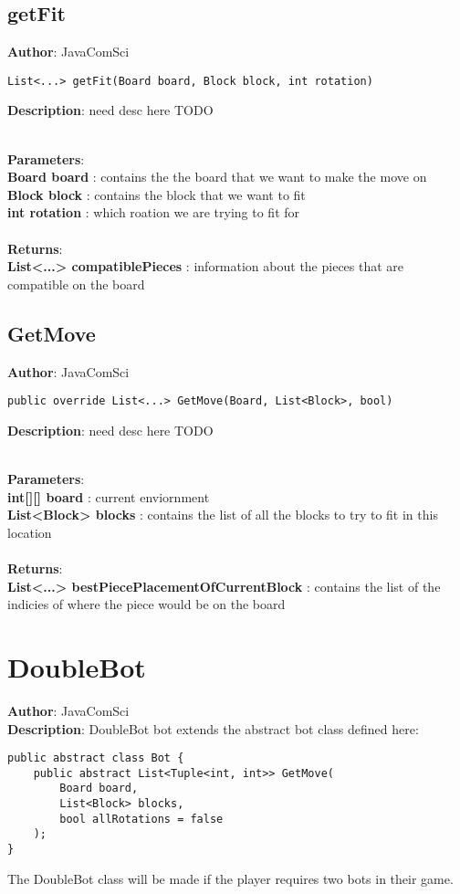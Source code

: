 \documentclass[12pt]{article}
\begin{document}
\subsection{getFit}
\textbf{Author}: JavaComSci 
\vspace*{1\baselineskip}
\begin{lstlisting}
List<...> getFit(Board board, Block block, int rotation)
\end{lstlisting} 
\vspace*{1\baselineskip}
\textbf{Description}: need desc here TODO 


\textbf{\large{\\Parameters}}:\\
\textbf{Board board }: contains the the board that we want to make the move on\\
\textbf{Block block }: contains the block that we want to fit\\
\textbf{int rotation }: which roation we are trying to fit for\\\textbf{\large{\\Returns}}:\\\textbf{List<...> compatiblePieces }: information about the pieces that are compatible on the board

\subsection{GetMove}
\textbf{Author}: JavaComSci 
\vspace*{1\baselineskip}
\begin{lstlisting}
public override List<...> GetMove(Board, List<Block>, bool)
\end{lstlisting} 
\vspace*{1\baselineskip}
\textbf{Description}: need desc here TODO 


\textbf{\large{\\Parameters}}:\\
\textbf{int[][] board }: current enviornment\\
\textbf{List<Block> blocks }: contains the list of all the blocks to try to fit in this location\\\textbf{\large{\\Returns}}:\\\textbf{List<...> bestPiecePlacementOfCurrentBlock }: contains the list of the indicies of where the piece would be on the board

\section{DoubleBot}
\textbf{Author}: JavaComSci \\
\textbf{Description}: DoubleBot bot extends the abstract bot class defined here: 
\begin{verbatim}
public abstract class Bot {
    public abstract List<Tuple<int, int>> GetMove(
        Board board, 
        List<Block> blocks, 
        bool allRotations = false
    );
}
\end{verbatim}
 The DoubleBot class will be made if the player requires two bots in their game. \\
\end{document}
